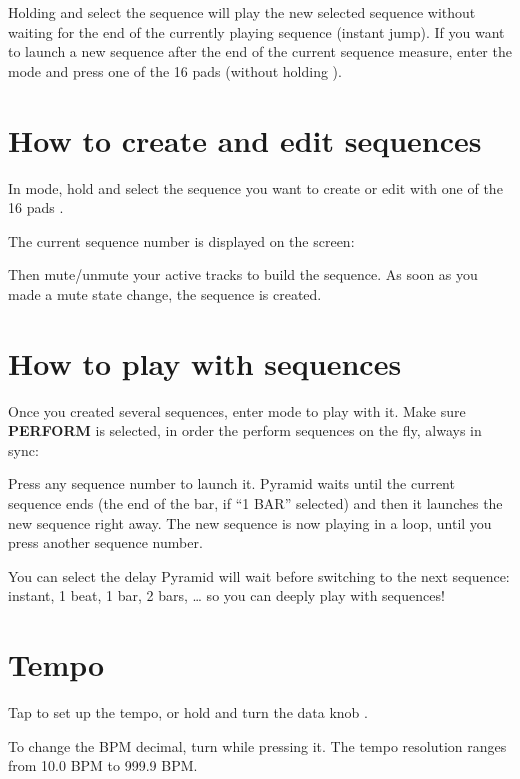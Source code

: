 Holding  and select the sequence will play the new selected sequence without waiting for the end of the currently playing sequence (instant jump). If you want to launch a new sequence after the end of the current sequence measure, enter the  mode and press one of the 16 pads \padsicon{} (without holding ).


\section{How to create and edit sequences}

In  mode, hold  and select the sequence you want to create or edit with one of the 16 pads \padsicon{}.

The current sequence number is displayed on the screen:


Then mute/unmute your active tracks to build the sequence. As soon as you made a mute state change, the sequence is created.


\section{How to play with sequences}

Once you created several sequences, enter  mode to play with it. Make sure \textbf{PERFORM} is selected, in order the perform sequences on the fly, always in sync:

Press any sequence number \padsicon{} to launch it. Pyramid waits until the current sequence ends (the end of the bar, if ``1 BAR'' selected) and then it launches the new sequence right away. The new sequence is now playing in a loop, until you press another sequence number.

You can select the delay Pyramid will wait before switching to the next sequence: instant, 1 beat, 1 bar, 2 bars, \ldots{} so you can deeply play with sequences!


\section{Tempo}

Tap  to set up the tempo, or hold  and turn the data knob \encodericon{}.

To change the BPM decimal, turn \encodericon{} while pressing it. The tempo resolution ranges from 10.0 BPM to 999.9 BPM.

